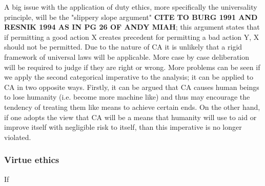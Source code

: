 A big issue with the application of duty ethics, more specifically the universality principle, will be the "slippery slope argument" {\bf CITE TO BURG 1991 AND RESNIK 1994 AS IN PG 26 OF ANDY MIAH}; this argument states that if permitting a good action X creates precedent for permitting a bad action Y, X should not be permitted. Due to the nature of CA it is unlikely that a rigid framework of universal laws will be applicable. More case by case deliberation will be required to judge if they are right or wrong. More problems can be seen if we apply the second categorical imperative to the analysis; it can be applied to CA in two opposite ways. Firstly, it can be argued that CA causes human beings to lose humanity (i.e. become more machine like) and thus may encourage the tendency of treating them like means to achieve certain ends. On the other hand, if one adopts the view that CA will be a means that humanity will use to aid or improve itself with negligible risk to itself, than this imperative is no longer violated.



\subsubsection{Virtue ethics}






If 




